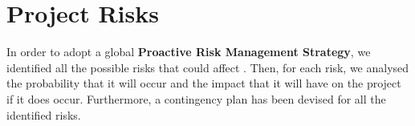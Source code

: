 \section{Project Risks}
In order to adopt a global \textbf{Proactive Risk Management Strategy}, we identified all the possible risks that could affect \myTaxiService{}. Then, for each risk, we analysed the probability that it will occur and the impact that it will have on the project if it does occur. Furthermore, a contingency plan has been devised for all the identified risks.
%
